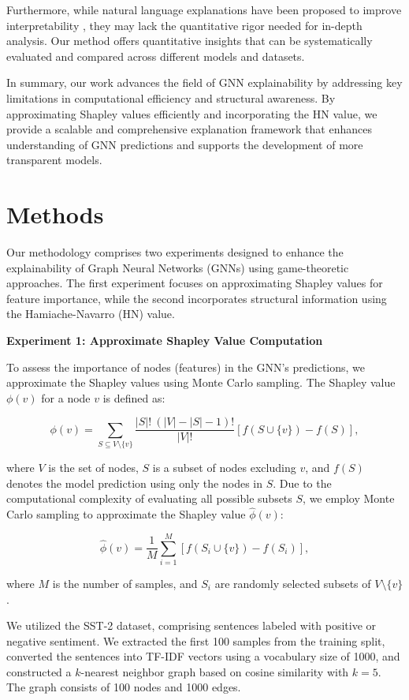 \documentclass{article}
\begin{document}
Furthermore, while natural language explanations have been proposed to improve interpretability \cite{arXiv:2411.02540v2}, they may lack the quantitative rigor needed for in-depth analysis. Our method offers quantitative insights that can be systematically evaluated and compared across different models and datasets.

In summary, our work advances the field of GNN explainability by addressing key limitations in computational efficiency and structural awareness. By approximating Shapley values efficiently and incorporating the HN value, we provide a scalable and comprehensive explanation framework that enhances understanding of GNN predictions and supports the development of more transparent models.

\section{Methods}
Our methodology comprises two experiments designed to enhance the explainability of Graph Neural Networks (GNNs) using game-theoretic approaches. The first experiment focuses on approximating Shapley values for feature importance, while the second incorporates structural information using the Hamiache-Navarro (HN) value.

\textbf{Experiment 1: Approximate Shapley Value Computation}

To assess the importance of nodes (features) in the GNN's predictions, we approximate the Shapley values using Monte Carlo sampling. The Shapley value $\phi(v)$ for a node $v$ is defined as:

\[
\phi(v) = \sum_{S \subseteq V \setminus \{v\}} \frac{|S|!\ (|V| - |S| - 1)!}{|V|!} \left[ f(S \cup \{v\}) - f(S) \right],
\]

where $V$ is the set of nodes, $S$ is a subset of nodes excluding $v$, and $f(S)$ denotes the model prediction using only the nodes in $S$. Due to the computational complexity of evaluating all possible subsets $S$, we employ Monte Carlo sampling to approximate the Shapley value $\hat{\phi}(v)$:

\[
\hat{\phi}(v) = \frac{1}{M} \sum_{i=1}^{M} \left[ f(S_i \cup \{v\}) - f(S_i) \right],
\]

where $M$ is the number of samples, and $S_i$ are randomly selected subsets of $V \setminus \{v\}$.

We utilized the SST-2 dataset, comprising sentences labeled with positive or negative sentiment. We extracted the first 100 samples from the training split, converted the sentences into TF-IDF vectors using a vocabulary size of 1000, and constructed a $k$-nearest neighbor graph based on cosine similarity with $k=5$. The graph consists of 100 nodes and 1000 edges.
\end{document}
